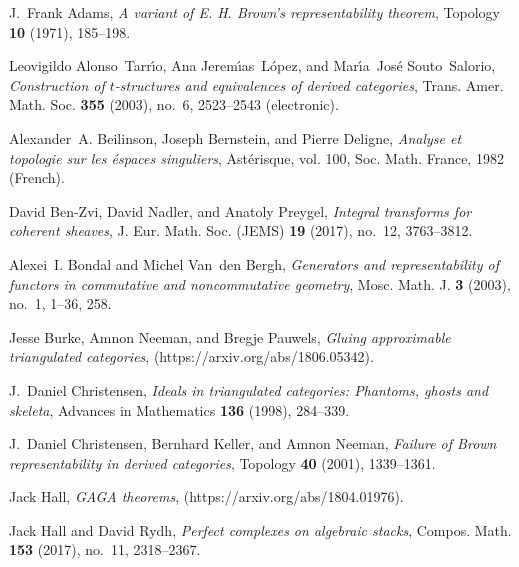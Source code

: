 \documentclass[11pt]{amsart}
\begin{document}
\def\cprime{$'$}
\providecommand{\bysame}{\leavevmode\hbox to3em{\hrulefill}\thinspace}
\providecommand{\MR}{\relax\ifhmode\unskip\space\fi MR }
\providecommand{\MRhref}[2]{%
  \href{http://www.ams.org/mathscinet-getitem?mr=#1}{#2}
}
\providecommand{\href}[2]{#2}
\begin{thebibliography}{10}

J.~Frank Adams, \emph{A variant of {E. H. Brown's} representability theorem},
  Topology \textbf{10} (1971), 185--198.

Leovigildo Alonso~Tarr{\'{\i}}o, Ana Jerem{\'{\i}}as~L{\'o}pez, and
  Mar{\'{\i}}a~Jos{\'e} Souto~Salorio, \emph{Construction of {$t$}-structures
  and equivalences of derived categories}, Trans. Amer. Math. Soc. \textbf{355}
  (2003), no.~6, 2523--2543 (electronic).

Alexander~A. Beilinson, Joseph Bernstein, and Pierre Deligne, \emph{Analyse et
  topologie sur les {\'e}spaces singuliers}, Ast{\'e}risque, vol. 100, Soc.
  Math. France, 1982 (French).

David Ben-Zvi, David Nadler, and Anatoly Preygel, \emph{Integral transforms for
  coherent sheaves}, J. Eur. Math. Soc. (JEMS) \textbf{19} (2017), no.~12,
  3763--3812.

Alexei~I. Bondal and Michel Van~den Bergh, \emph{Generators and
  representability of functors in commutative and noncommutative geometry},
  Mosc. Math. J. \textbf{3} (2003), no.~1, 1--36, 258.

Jesse Burke, Amnon Neeman, and Bregje Pauwels, \emph{Gluing approximable
  triangulated categories},  (https://arxiv.org/abs/1806.05342).

J.~Daniel Christensen, \emph{Ideals in triangulated categories: Phantoms,
  ghosts and skeleta}, Advances in Mathematics \textbf{136} (1998), 284--339.

J.~Daniel Christensen, Bernhard Keller, and Amnon Neeman, \emph{Failure of
  {Brown} representability in derived categories}, Topology \textbf{40} (2001),
  1339--1361.

Jack Hall, \emph{{GAGA} theorems},  (https://arxiv.org/abs/1804.01976).

Jack Hall and David Rydh, \emph{Perfect complexes on algebraic stacks}, Compos.
  Math. \textbf{153} (2017), no.~11, 2318--2367.


\end{thebibliography}
\end{document}
